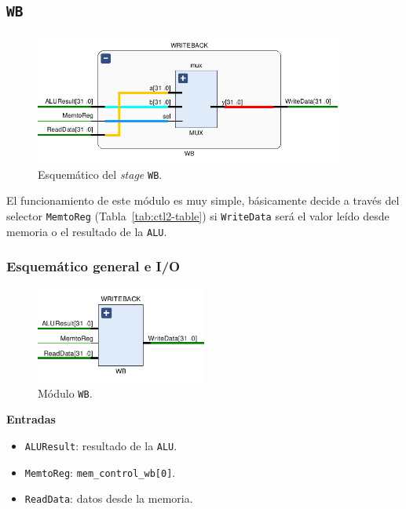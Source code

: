 \documentclass[a4paper]{article}
\begin{document}
\subsection{\texttt{WB}}

\begin{figure}[H]
	\begin{center}				
	\includegraphics[width=0.9\textwidth,center]{TP4_15.png}
  	\caption{Esquemático del \textit{stage} \texttt{WB}.}
  	\label{fig:funcionamiento.}
  	\end{center}
\end{figure}

El funcionamiento de este módulo es muy simple, básicamente decide a través del selector \texttt{MemtoReg} (Tabla~\ref{tab:ctl2-table}) si \texttt{WriteData} será el valor leído desde memoria o el resultado de la \texttt{ALU}.

\subsubsection{Esquemático general e I/O}

\begin{figure}[H]
	\begin{center}				
	\includegraphics[width=0.5\textwidth,center]{TP4_16.png}
  	\caption{Módulo \texttt{WB}.}
  	\label{fig:funcionamiento.}
  	\end{center}
\end{figure}

\textbf{Entradas}
\begin{itemize}
	\item \texttt{ALUResult}: resultado de la \texttt{ALU}.
	\item \texttt{MemtoReg}: \texttt{mem\_control\_wb[0]}.
	\item \texttt{ReadData}: datos desde la memoria.
\end{itemize}
\end{document}
